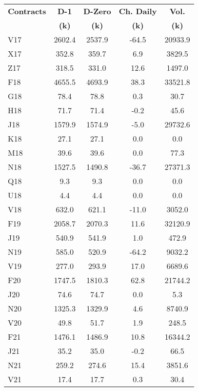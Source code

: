 \documentclass[article,crop=false]{standalone}%
\begin{document}
%
\normalsize%
\setlength{\tabcolsep}{0.15cm}%
\begin{tabular}[h]{l | c c c c}%
\hline%
\rowcolor{white}%
\textbf{Contracts}&\textbf{D{-}1}&\textbf{D{-}Zero}&\textbf{Ch. Daily}&\textbf{Vol.}\\%
\rowcolor{white}%
\textbf{}&\textbf{(k)}&\textbf{(k)}&\textbf{(k)}&\textbf{(k)}\\%
\hline%
\rowcolor{lightgray}%
V17&2602.4&2537.9&{-}64.5&20933.9\\%
\rowcolor{white}%
X17&352.8&359.7&6.9&3829.5\\%
\rowcolor{lightgray}%
Z17&318.5&331.0&12.6&1497.0\\%
\rowcolor{white}%
F18&4655.5&4693.9&38.3&33521.8\\%
\rowcolor{lightgray}%
G18&78.4&78.8&0.3&30.7\\%
\rowcolor{white}%
H18&71.7&71.4&{-}0.2&45.6\\%
\rowcolor{lightgray}%
J18&1579.9&1574.9&{-}5.0&29732.6\\%
\rowcolor{white}%
K18&27.1&27.1&0.0&0.0\\%
\rowcolor{lightgray}%
M18&39.6&39.6&0.0&77.3\\%
\rowcolor{white}%
N18&1527.5&1490.8&{-}36.7&27371.3\\%
\rowcolor{lightgray}%
Q18&9.3&9.3&0.0&0.0\\%
\rowcolor{white}%
U18&4.4&4.4&0.0&0.0\\%
\rowcolor{lightgray}%
V18&632.0&621.1&{-}11.0&3052.0\\%
\rowcolor{white}%
F19&2058.7&2070.3&11.6&32120.9\\%
\rowcolor{lightgray}%
J19&540.9&541.9&1.0&472.9\\%
\rowcolor{white}%
N19&585.0&520.9&{-}64.2&9032.2\\%
\rowcolor{lightgray}%
V19&277.0&293.9&17.0&6689.6\\%
\rowcolor{white}%
F20&1747.5&1810.3&62.8&21744.2\\%
\rowcolor{lightgray}%
J20&74.6&74.7&0.0&5.3\\%
\rowcolor{white}%
N20&1325.3&1329.9&4.6&8740.9\\%
\rowcolor{lightgray}%
V20&49.8&51.7&1.9&248.5\\%
\rowcolor{white}%
F21&1476.1&1486.9&10.8&16344.2\\%
\rowcolor{lightgray}%
J21&35.2&35.0&{-}0.2&66.5\\%
\rowcolor{white}%
N21&259.2&274.6&15.4&3851.6\\%
\rowcolor{lightgray}%
V21&17.4&17.7&0.3&30.4\\%

\end{tabular}
\end{document}

